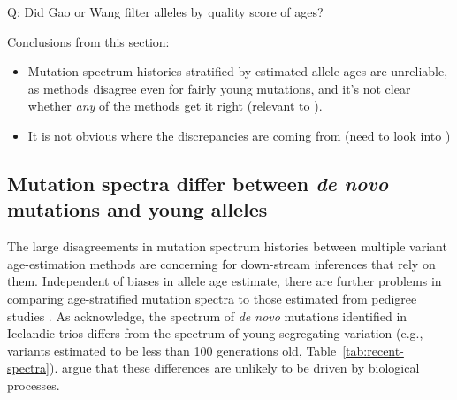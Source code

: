 \documentclass[]{article}
\begin{document}
Q: Did Gao or Wang filter alleles by quality score of ages?

Conclusions from this section:
\begin{itemize}
    \item Mutation spectrum histories stratified by estimated allele ages are
        unreliable, as methods disagree even for fairly young mutations,
        and it's not clear whether \emph{any} of the methods get
        it right (relevant to \citet{gao2022limited}).
    \item It is not obvious where the discrepancies are coming from (need
        to look into \citet{brandt2022evaluation})
\end{itemize}

\subsection*{Mutation spectra differ between \emph{de novo} mutations and young
alleles}

The large disagreements in mutation spectrum histories between multiple variant
age-estimation methods are concerning for down-stream inferences that rely on
them. Independent of biases in allele age estimate, there are further problems
in comparing age-stratified mutation spectra to those estimated from pedigree
studies \citep{jonsson2017parental,halldorsson2019characterizing}. As
\citet{wang2023human} acknowledge, the spectrum of \emph{de novo} mutations
identified in Icelandic trios \citep{jonsson2017parental} differs from the
spectrum of young segregating variation (e.g., variants estimated to be less
than 100 generations old, Table~\ref{tab:recent-spectra}).
\citet{gao2022limited} argue that these differences are unlikely to be driven
by biological processes.
\end{document}
